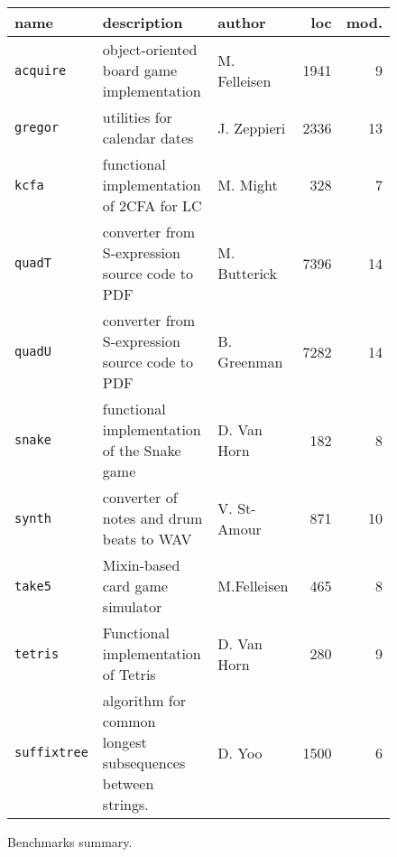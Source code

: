 
\begin{figure*}
\begin{tabular}{p{1.4cm} | p{6.9cm} | p{2.0cm} | r | r}
             {\bf  name} & {\bf description} & {\bf author} & {\bf loc} & {\bf mod.} \\ \hline

\texttt{acquire} & object-oriented board game implementation      & M. Felleisen & 1941 & 9 \\ \hline

\texttt{gregor}  & utilities for calendar dates                   & J. Zeppieri  & 2336 & 13\\ \hline

\texttt{kcfa}    & functional implementation of 2CFA for LC       & M. Might & 328 & 7\\ \hline

\texttt{quadT}   & converter from S-expression source code to PDF & M. Butterick & 7396 & 14\\ \hline

\texttt{quadU}   & converter from S-expression source code to PDF & B. Greenman  & 7282 & 14 \\ \hline

\texttt{snake}   & functional implementation of the Snake game    & D. Van Horn & 182 & 8 \\ \hline

\texttt{synth}  & converter of notes and drum beats to WAV & V. St-Amour & 871 & 10 \\ \hline

\texttt{take5} & Mixin-based card game simulator & M.Felleisen & 465 & 8\\ \hline

\texttt{tetris} & Functional implementation of Tetris & D. Van Horn &   280 & 9 \\ \hline

\texttt{suffix\-tree} & algorithm for common longest subsequences between strings. & D. Yoo & 1500 & 6 \\ 

\end{tabular}

\caption{Benchmarks summary.} \label{table:benchmark-descriptions}

\end{figure*}


